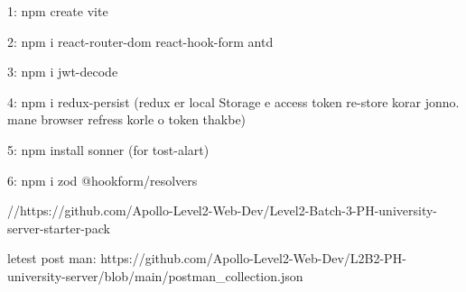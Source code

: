 1: npm create vite

2: npm i react-router-dom react-hook-form antd

3: npm i jwt-decode

4: npm i redux-persist (redux er local Storage e access token re-store korar jonno. mane browser refress korle o token thakbe)

5: npm install sonner (for tost-alart)

6: npm i zod @hookform/resolvers

//https://github.com/Apollo-Level2-Web-Dev/Level2-Batch-3-PH-university-server-starter-pack

letest post man: https://github.com/Apollo-Level2-Web-Dev/L2B2-PH-university-server/blob/main/postman_collection.json